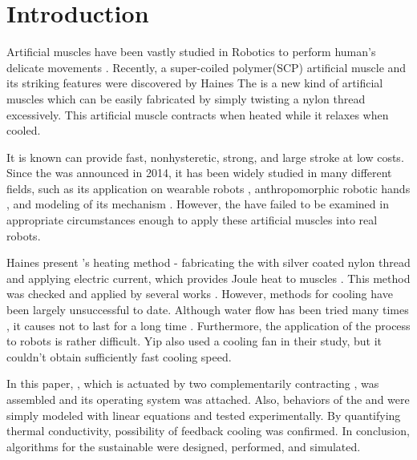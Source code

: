 
\section{Introduction}
Artificial muscles have been vastly studied in Robotics to perform human's delicate movements \cite{ashley}. Recently, a super-coiled polymer(SCP) artificial muscle and its striking features were discovered by Haines \etal \cite{haines} The \scp is a new kind of artificial muscles which can be easily fabricated by simply twisting a nylon thread excessively. This artificial muscle contracts when heated while it relaxes when cooled.

It is known \scps can provide fast, nonhysteretic, strong, and large stroke at low costs\cite{yuan, mirvakili, madden}. 
Since the \scp was announced in 2014, it has been widely studied in many different fields, such as its application on
wearable robots \cite{sphincter, kianzad2}, 
anthropomorphic robotic hands \cite{yip, finger}, 
and modeling of its mechanism \cite{treatise, torsional, youngmodulus, fab_coil, multiscale, healing, kianzad, moretti}. 
However, the \scps have failed to be examined in appropriate circumstances enough to apply these artificial muscles into real robots.

Haines \etalspace present \scpnospace's heating method - fabricating the \scps with silver coated nylon thread and applying electric current, which provides Joule heat to muscles \cite{haines}. This method was checked and applied by several works \cite{yip, mirvakili,kianzad,sphincter,kianzad2}. However, methods for cooling \scps have been largely unsuccessful to date. 
Although water flow has been tried many times \cite{haines,finger},
it causes \scps not to last for a long time \cite{haines}.
Furthermore, the application of the process to robots is rather difficult.
Yip \etalspace also used a cooling fan in their study, but it couldn't obtain sufficiently fast cooling speed.

In this paper, \antanospace, which is actuated by two complementarily contracting \scpsnospace, was assembled and its operating system was attached. Also, behaviors of the \scps and \anta were simply modeled with linear equations and tested experimentally. By quantifying thermal conductivity, possibility of feedback cooling was confirmed. In conclusion, algorithms for the sustainable \apc were designed, performed, and simulated.